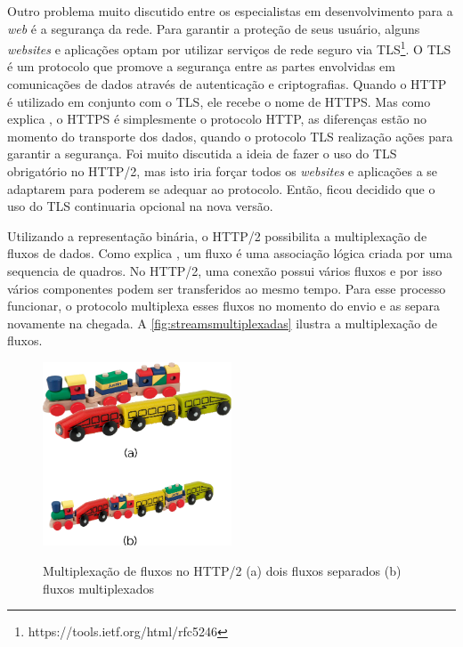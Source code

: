 Outro problema muito discutido entre os especialistas em desenvolvimento para a \textit{web} é a segurança da rede. Para garantir a proteção de seus usuário, alguns \textit{websites} e aplicações optam por utilizar serviços de rede seguro via TLS\footnote{https://tools.ietf.org/html/rfc5246}. O TLS é um protocolo que promove a segurança entre as partes envolvidas em comunicações de dados através de autenticação e criptografias. Quando o HTTP é utilizado em conjunto com o TLS, ele recebe o nome de HTTPS. Mas como explica , o HTTPS é simplesmente o protocolo HTTP, as diferenças estão no momento do transporte dos dados, quando o protocolo TLS realização ações para garantir a segurança. Foi muito discutida a ideia de fazer o uso do TLS obrigatório no HTTP/2, mas isto iria forçar todos os \textit{websites} e aplicações a se adaptarem para poderem se adequar ao protocolo. Então, ficou decidido que o uso do TLS continuaria opcional na nova versão.

Utilizando a representação binária, o HTTP/2 possibilita a multiplexação de fluxos de dados. Como explica , um fluxo é uma associação lógica criada por uma sequencia de quadros. No HTTP/2, uma conexão possui vários fluxos e por isso vários componentes podem ser transferidos ao mesmo tempo. Para esse processo funcionar, o protocolo multiplexa esses fluxos no momento do envio e as separa novamente na chegada. A \autoref{fig:streamsmultiplexadas} ilustra a multiplexação de fluxos.

\begin{figure}[!htb]
    \centering
    \caption{Multiplexação de fluxos no HTTP/2 (a) dois fluxos separados (b) fluxos multiplexados}
    \includegraphics[width=0.5\textwidth]{./04-figuras/fund-teorica/multiplexed_streams}
    \label{fig:streamsmultiplexadas}
\end{figure}

